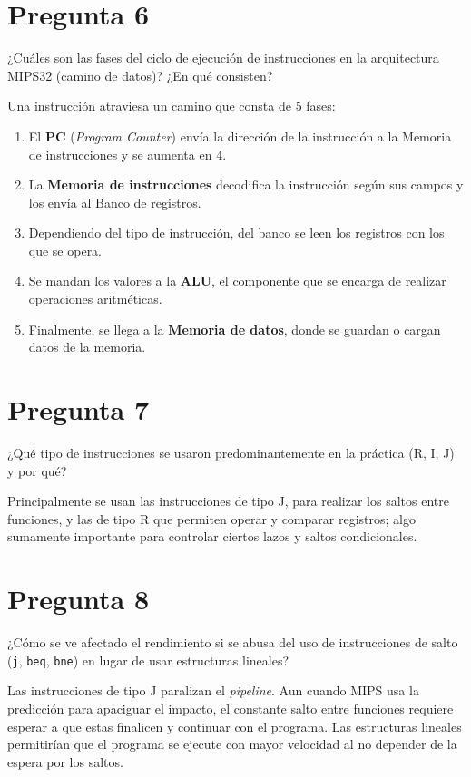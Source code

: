\documentclass[12pt]{article}
\begin{document}
\section*{Pregunta 6}
¿Cuáles son las fases del ciclo de ejecución de instrucciones en la arquitectura MIPS32 (camino de datos)? ¿En qué consisten?

Una instrucción atraviesa un camino que consta de 5 fases:
\begin{enumerate}
    \item El \textbf{PC} (\textit{Program Counter}) envía la dirección de la instrucción a la Memoria de instrucciones y se aumenta en 4.
    \item La \textbf{Memoria de instrucciones} decodifica la instrucción según sus campos y los envía al Banco de registros.
    \item Dependiendo del tipo de instrucción, del banco se leen los registros con los que se opera.
    \item Se mandan los valores a la \textbf{ALU}, el componente que se encarga de realizar operaciones aritméticas.
    \item Finalmente, se llega a la \textbf{Memoria de datos}, donde se guardan o cargan datos de la memoria.
\end{enumerate}

\section*{Pregunta 7}
¿Qué tipo de instrucciones se usaron predominantemente en la práctica (R, I, J) y por qué?

Principalmente se usan las instrucciones de tipo J, para realizar los saltos entre funciones, y las de tipo R que permiten operar y comparar registros; algo sumamente importante para controlar ciertos lazos y saltos condicionales.

\section*{Pregunta 8}
¿Cómo se ve afectado el rendimiento si se abusa del uso de instrucciones de salto (\texttt{j}, \texttt{beq}, \texttt{bne}) en lugar de usar estructuras lineales?

Las instrucciones de tipo J paralizan el \textit{pipeline}. Aun cuando MIPS usa la predicción para apaciguar el impacto, el constante salto entre funciones requiere esperar a que estas finalicen y continuar con el programa. Las estructuras lineales permitirían que el programa se ejecute con mayor velocidad al no depender de la espera por los saltos.
\end{document}
